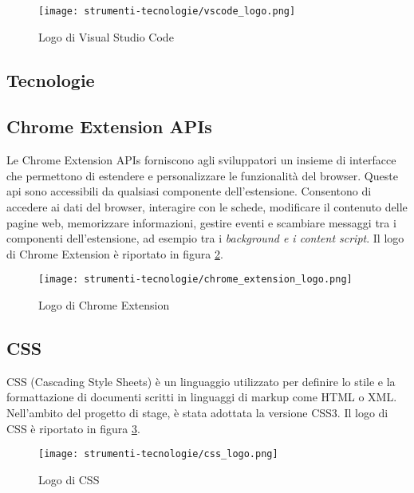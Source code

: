 \begin{figure}[H]
  \centering 
  \texttt{[image: strumenti-tecnologie/vscode\_logo.png]} 
  \caption{Logo di Visual Studio Code}
  \label{fig:logo_vscode} 
\end{figure}

\subsection{Tecnologie}

\subsection*{Chrome Extension APIs}

\par Le Chrome Extension APIs forniscono agli sviluppatori un insieme di interfacce che permettono di estendere e personalizzare le funzionalità del browser. Queste \gls{api} sono accessibili da qualsiasi componente dell’estensione. Consentono di accedere ai dati del browser, interagire con le schede, modificare il contenuto delle pagine web, memorizzare informazioni, gestire eventi e scambiare messaggi tra i componenti dell’estensione, ad esempio tra i \textit{background e i content script}. Il logo di Chrome Extension è riportato in figura \ref{fig:logo_chrome_extension}.

\begin{figure}[H]
  \centering 
  \texttt{[image: strumenti-tecnologie/chrome\_extension\_logo.png]} 
  \caption{Logo di Chrome Extension}
  \label{fig:logo_chrome_extension} 
\end{figure}

\subsection*{CSS}

\par CSS (Cascading Style Sheets) è un linguaggio utilizzato per definire lo stile e la formattazione di documenti scritti in linguaggi di markup come HTML o XML. Nell’ambito del progetto di stage, è stata adottata la versione CSS3. Il logo di CSS è riportato in figura \ref{fig:logo_css}.

\begin{figure}[H]
  \centering 
  \texttt{[image: strumenti-tecnologie/css\_logo.png]} 
  \caption{Logo di CSS}
  \label{fig:logo_css} 
\end{figure}

